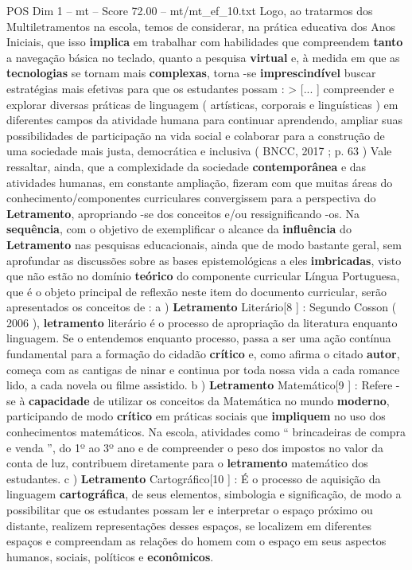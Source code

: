 \begin{textsample}{POS Dim 1 – mt – Score 72.00 – mt/mt\_ef\_10.txt}
Logo, ao tratarmos dos Multiletramentos na escola, temos de considerar, na prática educativa dos Anos Iniciais, que isso \textbf{implica} em trabalhar com habilidades que compreendem \textbf{tanto} a navegação básica no teclado, quanto a pesquisa \textbf{virtual} e, à medida em que as \textbf{tecnologias} se tornam mais \textbf{complexas}, torna -se \textbf{imprescindível} buscar estratégias mais efetivas para que os estudantes possam : > [... ] compreender e explorar diversas práticas de linguagem ( artísticas, corporais e linguísticas ) em diferentes campos da atividade humana para continuar aprendendo, ampliar suas possibilidades de participação na vida social e colaborar para a construção de uma sociedade mais justa, democrática e inclusiva ( BNCC, 2017 ; p. 63 ) Vale ressaltar, ainda, que a complexidade da sociedade \textbf{contemporânea} e das atividades humanas, em constante ampliação, fizeram com que muitas áreas do conhecimento/componentes curriculares convergissem para a perspectiva do \textbf{Letramento}, apropriando -se dos conceitos e/ou ressignificando -os.
Na \textbf{sequência}, com o objetivo de exemplificar o alcance da \textbf{influência} do \textbf{Letramento} nas pesquisas educacionais, ainda que de modo bastante geral, sem aprofundar as discussões sobre as bases epistemológicas a eles \textbf{imbricadas}, visto que não estão no domínio \textbf{teórico} do componente curricular Língua Portuguesa, que é o objeto principal de reflexão neste item do documento curricular, serão apresentados os conceitos de : a ) \textbf{Letramento} Literário[8 ] : Segundo Cosson ( 2006 ), \textbf{letramento} literário é o processo de apropriação da literatura enquanto linguagem.
Se o entendemos enquanto processo, passa a ser uma ação contínua fundamental para a formação do cidadão \textbf{crítico} e, como afirma o citado \textbf{autor}, começa com as cantigas de ninar e continua por toda nossa vida a cada romance lido, a cada novela ou filme assistido. b ) \textbf{Letramento} Matemático[9 ] : Refere -se à \textbf{capacidade} de utilizar os conceitos da Matemática no mundo \textbf{moderno}, participando de modo \textbf{crítico} em práticas sociais que \textbf{impliquem} no uso dos conhecimentos matemáticos.
Na escola, atividades como “ brincadeiras de compra e venda ”, do 1º ao 3º ano e de compreender o peso dos impostos no valor da conta de luz, contribuem diretamente para o \textbf{letramento} matemático dos estudantes. c ) \textbf{Letramento} Cartográfico[10 ] : É o processo de aquisição da linguagem \textbf{cartográfica}, de seus elementos, simbologia e significação, de modo a possibilitar que os estudantes possam ler e interpretar o espaço próximo ou distante, realizem representações desses espaços, se localizem em diferentes espaços e compreendam as relações do homem com o espaço em seus aspectos humanos, sociais, políticos e \textbf{econômicos}.

\end{textsample}
